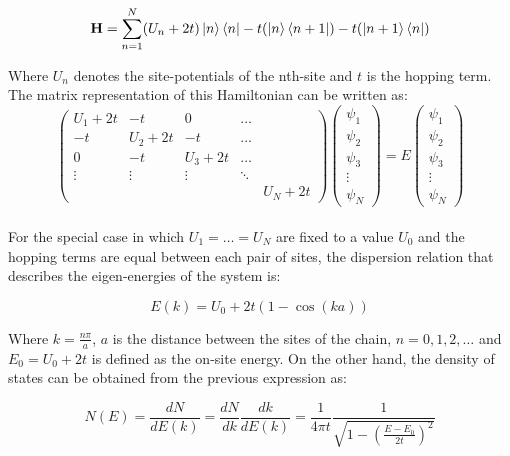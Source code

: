\documentclass[12pt]{article}
\begin{document}
\begin{equation}\label{TBH}
 \textbf{H} = \sum_{n=1}^{N}(U_{n}+2t)\ket{n}\bra{n} -t(\ket{n}\bra{n+1}) - t(\ket{n+1}\bra{n})
\end{equation}
 
Where $U_{n}$ denotes the site-potentials of the nth-site and $t$ is the hopping term. The matrix representation of this Hamiltonian can be written as: 
\\
\[\left(
	\begin{matrix}
	U_{1}+2t & -t & 0 & \hdots & \\
	-t & U_{2}+2t & -t & \hdots & \\
	0 & -t & U_{3}+2t & \hdots & \\
	\vdots & \vdots & \vdots &\ddots & \\
	& & & & U_{N}+2t
	\end{matrix} 
	\right)
	\left(
	\begin{array}{c}
    	\psi_{1}  \\
    	\psi_{2} \\
    	\psi_{3} \\
    	\vdots  \\
    	\psi_{N}
	\end{array}
	\right) 
	= E \left(\begin{array}{c}
	    \psi_{1}  \\
 	   	\psi_{2} \\
	    \psi_{3} \\
 	   	\vdots  \\
 	   \psi_{N}
	\end{array}
\right)
\]
\\

For the special case in which $U_{1} = \hdots = U_{N}$ are fixed to a value $U_{0}$ and the hopping terms are equal between each pair of sites, the dispersion relation that describes the eigen-energies of the system is:

\begin{equation}\label{DispRel}
	E(k) = U_{0} + 2t(1-\cos(ka))
\end{equation}

Where $k=\frac{n\pi}{a}$, $a$ is the distance between the sites of the chain, $n=0,1,2, \hdots$ and $E_{0} = U_{0}+2t$ is defined as the on-site energy. On the other hand, the density of states can be obtained from the previous expression as:

\begin{equation}\label{DoS}
	N(E) = \frac{dN}{dE(k)} = \frac{dN}{dk}\frac{dk}{dE(k)} = \frac{1}{4\pi t} \frac{1}{\sqrt{1-\left(\frac{E-E_{0}}{2t}\right)^{2}}}    
\end{equation}
\end{document}
